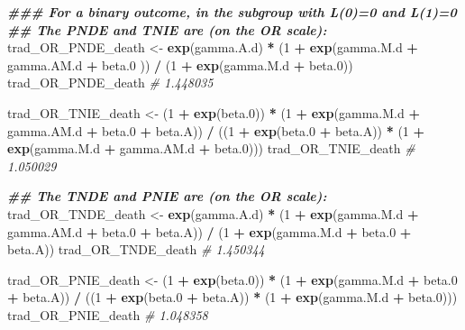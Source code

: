 \documentclass[
]{book}
\newenvironment{Shaded}{\begin{snugshade}}{\end{snugshade}}
\newcommand{\CommentTok}[1]{\textcolor[rgb]{0.56,0.35,0.01}{\textit{#1}}}
\newcommand{\DecValTok}[1]{\textcolor[rgb]{0.00,0.00,0.81}{#1}}
\newcommand{\DocumentationTok}[1]{\textcolor[rgb]{0.56,0.35,0.01}{\textbf{\textit{#1}}}}
\newcommand{\FloatTok}[1]{\textcolor[rgb]{0.00,0.00,0.81}{#1}}
\newcommand{\FunctionTok}[1]{\textcolor[rgb]{0.13,0.29,0.53}{\textbf{#1}}}
\newcommand{\NormalTok}[1]{#1}
\newcommand{\OtherTok}[1]{\textcolor[rgb]{0.56,0.35,0.01}{#1}}
\newcommand{\SpecialCharTok}[1]{\textcolor[rgb]{0.81,0.36,0.00}{\textbf{#1}}}
\begin{document}
\begin{Shaded}
\begin{Highlighting}[]
\DocumentationTok{\#\#\# For a binary outcome, in the subgroup with L(0)=0 and L(1)=0}
\DocumentationTok{\#\# The PNDE and TNIE are (on the OR scale):}
\NormalTok{trad\_OR\_PNDE\_death }\OtherTok{\textless{}{-}} \FunctionTok{exp}\NormalTok{(gamma.A.d) }\SpecialCharTok{*}
\NormalTok{  (}\DecValTok{1} \SpecialCharTok{+} \FunctionTok{exp}\NormalTok{(gamma.M.d }\SpecialCharTok{+}\NormalTok{ gamma.AM.d }\SpecialCharTok{+}\NormalTok{ beta}\FloatTok{.0}\NormalTok{ )) }\SpecialCharTok{/}
\NormalTok{  (}\DecValTok{1} \SpecialCharTok{+} \FunctionTok{exp}\NormalTok{(gamma.M.d }\SpecialCharTok{+}\NormalTok{ beta}\FloatTok{.0}\NormalTok{))}
\NormalTok{trad\_OR\_PNDE\_death}
\CommentTok{\# 1.448035}

\NormalTok{trad\_OR\_TNIE\_death }\OtherTok{\textless{}{-}}\NormalTok{ (}\DecValTok{1} \SpecialCharTok{+} \FunctionTok{exp}\NormalTok{(beta}\FloatTok{.0}\NormalTok{)) }\SpecialCharTok{*}
\NormalTok{  (}\DecValTok{1} \SpecialCharTok{+} \FunctionTok{exp}\NormalTok{(gamma.M.d }\SpecialCharTok{+}\NormalTok{ gamma.AM.d }\SpecialCharTok{+}\NormalTok{ beta}\FloatTok{.0} \SpecialCharTok{+}\NormalTok{ beta.A)) }\SpecialCharTok{/}
\NormalTok{  ((}\DecValTok{1} \SpecialCharTok{+} \FunctionTok{exp}\NormalTok{(beta}\FloatTok{.0} \SpecialCharTok{+}\NormalTok{ beta.A)) }\SpecialCharTok{*}\NormalTok{ (}\DecValTok{1} \SpecialCharTok{+} \FunctionTok{exp}\NormalTok{(gamma.M.d }\SpecialCharTok{+}\NormalTok{ gamma.AM.d }\SpecialCharTok{+}\NormalTok{ beta}\FloatTok{.0}\NormalTok{)))}
\NormalTok{trad\_OR\_TNIE\_death}
\CommentTok{\# 1.050029}

\DocumentationTok{\#\# The TNDE and PNIE are (on the OR scale):}
\NormalTok{trad\_OR\_TNDE\_death }\OtherTok{\textless{}{-}} \FunctionTok{exp}\NormalTok{(gamma.A.d) }\SpecialCharTok{*}
\NormalTok{  (}\DecValTok{1} \SpecialCharTok{+} \FunctionTok{exp}\NormalTok{(gamma.M.d }\SpecialCharTok{+}\NormalTok{ gamma.AM.d }\SpecialCharTok{+}\NormalTok{ beta}\FloatTok{.0} \SpecialCharTok{+}\NormalTok{ beta.A)) }\SpecialCharTok{/}
\NormalTok{  (}\DecValTok{1} \SpecialCharTok{+} \FunctionTok{exp}\NormalTok{(gamma.M.d }\SpecialCharTok{+}\NormalTok{ beta}\FloatTok{.0} \SpecialCharTok{+}\NormalTok{ beta.A))}
\NormalTok{trad\_OR\_TNDE\_death}
\CommentTok{\# 1.450344}

\NormalTok{trad\_OR\_PNIE\_death }\OtherTok{\textless{}{-}}\NormalTok{ (}\DecValTok{1} \SpecialCharTok{+} \FunctionTok{exp}\NormalTok{(beta}\FloatTok{.0}\NormalTok{)) }\SpecialCharTok{*}
\NormalTok{  (}\DecValTok{1} \SpecialCharTok{+} \FunctionTok{exp}\NormalTok{(gamma.M.d }\SpecialCharTok{+}\NormalTok{ beta}\FloatTok{.0} \SpecialCharTok{+}\NormalTok{ beta.A)) }\SpecialCharTok{/}
\NormalTok{  ((}\DecValTok{1} \SpecialCharTok{+} \FunctionTok{exp}\NormalTok{(beta}\FloatTok{.0} \SpecialCharTok{+}\NormalTok{ beta.A)) }\SpecialCharTok{*}\NormalTok{ (}\DecValTok{1} \SpecialCharTok{+} \FunctionTok{exp}\NormalTok{(gamma.M.d }\SpecialCharTok{+}\NormalTok{ beta}\FloatTok{.0}\NormalTok{)))}
\NormalTok{trad\_OR\_PNIE\_death}
\CommentTok{\# 1.048358}
\end{Highlighting}
\end{Shaded}
\end{document}
